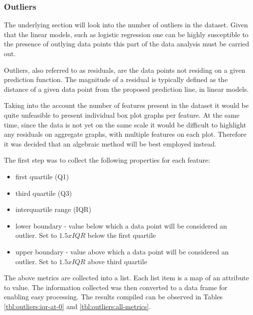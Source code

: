 \subsubsection{Outliers}\label{sec:impl-data-analysis:outliers}
The underlying section will look into the number of outliers in the dataset. Given that the linear models, such as logistic regression one can be highly susceptible to the presence of outlying data points this part of the data analysis must be carried out.

Outliers, also referred to as residuals, are the data points not residing on a given prediction function. The magnitude of a residual is typically defined as the distance of a given data point from the proposed prediction line, in linear models.

Taking into the account the number of features present in the dataset it would be quite unfeasible to present individual box plot graphs per feature. At the same time, since the data is not yet on the same scale it would be difficult to highlight any residuals on aggregate graphs, with multiple features on each plot. Therefore it was decided that an algebraic method will be best employed instead.

The first step was to collect the following properties for each feature:
\begin{itemize}
    \item first quartile (Q1)
    \item third quartile (Q3)
    \item interquartile range (IQR)
    \item lower boundary - value below which a data point will be considered an outlier. Set to $1.5x IQR$ below the first quartile
    \item upper boundary - value above which a data point will be considered an outlier. Set to $1.5x IQR$ above third quartile
\end{itemize}

The above metrics are collected into a list. Each list item is a map of an attribute to value. The information collected was then converted to a data frame for enabling easy processing. The results compiled can be observed in Tables \ref{tbl:outliers:iqr-at-0} and \ref{tbl:outliers:all-metrics}.


